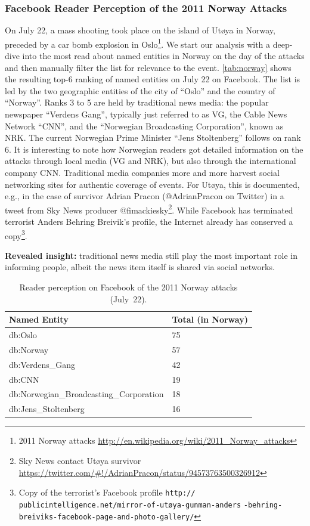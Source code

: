 \documentclass{iosart2c}
\begin{document}
\subsubsection{Facebook Reader Perception of the 2011 Norway Attacks}
On July 22, a mass shooting took place on the island of Utøya in Norway, preceded by a car bomb explosion in Oslo\footnote{2011 Norway attacks \url{http://en.wikipedia.org/wiki/2011_Norway_attacks}}.
We start our analysis with a deep-dive into the most read about named entities in Norway on the day of the attacks and then manually filter the list for relevance to the event.
\autoref{tab:norway} shows the resulting top-6 ranking of named entities on July 22 on Facebook.
The list is led by the two geographic entities of the city of ``Oslo'' and the country of ``Norway''.
Ranks 3 to 5 are held by traditional news media: the popular newspaper ``Verdens Gang'', typically just referred to as VG, the Cable News Network ``CNN'', and the ``Norwegian Broadcasting Corporation'', known as NRK.
The current Norwegian Prime Minister ``Jens Stoltenberg'' follows on rank 6.
It is interesting to note how Norwegian readers got detailed information on the attacks through local media (VG and NRK), but also through the international company CNN.
Traditional media companies more and more harvest social networking sites for authentic coverage of events.
For Utøya, this is documented, e.g., in the case of survivor Adrian Pracon (@AdrianPracon on Twitter) in a tweet from Sky News producer @fimackiesky\footnote{Sky News contact Utøya survivor \url{https://twitter.com/\#!/AdrianPracon/status/94573763500326912}}.
While Facebook has terminated terrorist Anders Behring Breivik's profile, the Internet already has conserved a copy\footnote{Copy of the terrorist's Facebook profile \scriptsize\texttt{http://} \texttt{publicintelligence.net/mirror-of-utøya-gunman-anders} \texttt{-behring-breiviks-facebook-page-and-photo-gallery/}}. 

\textbf{Revealed insight:}
traditional news media still play the most important role in informing people, albeit the news item itself is shared via social networks. 

\begin{table}
    \begin{tabular}{ | l | l |}
    \hline
	\textbf{Named Entity} & \textbf{Total (in Norway)}\\ \hline
	db:Oslo & 75\\
	db:Norway & 57\\
	db:Verdens\_Gang & 42\\
	db:CNN & 19\\
	db:Norwegian\_Broadcasting\_Corporation & 18\\
	db:Jens\_Stoltenberg & 16\\
    \hline
  \end{tabular}
  \caption{Reader perception on Facebook of the 2011 Norway attacks (July~22).}
  \label{tab:norway}  
\end{table}
\end{document}
